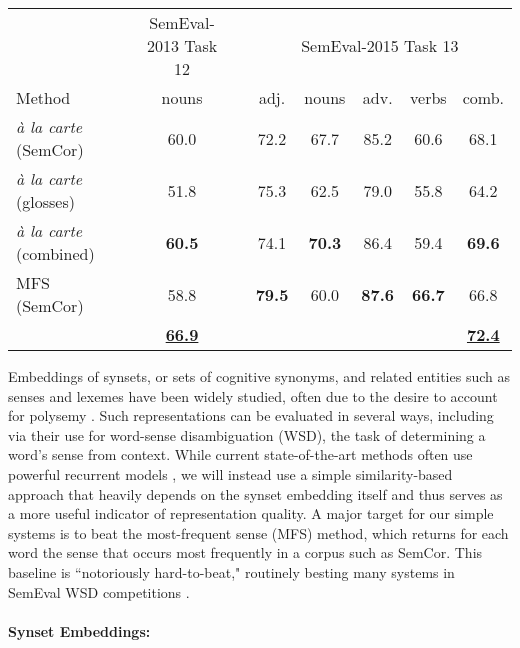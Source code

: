 \documentclass[11pt,a4paper]{article}
\begin{document}
\begin{table*}[t!]
	\centering
	\begin{threeparttable}
		\begin{tabular}{lcccccccc}
			&& SemEval-2013 Task 12 && \multicolumn{5}{c}{SemEval-2015 Task 13}\\
			Method && nouns && adj. & nouns & adv. & verbs & comb. \\
			\toprule
			{\em\`a la carte} (SemCor) && 60.0 && 72.2 & 67.7 & 85.2 & 60.6 & 68.1 \\
			{\em\`a la carte} (glosses) && 51.8 && 75.3 & 62.5 & 79.0 & 55.8 & 64.2 \\
			{\em\`a la carte} (combined) && \bf60.5 && 74.1 & \bf70.3 & 86.4 & 59.4 & \bf69.6\\
			\midrule
			MFS (SemCor) && 58.8 && \bf79.5 & 60.0 & \bf87.6 & \bf 66.7 & 66.8 \\
			\citet{Raganato:17} && \underline{\bf66.9} && & & & & \underline{\bf72.4} \\
			\bottomrule
		\end{tabular}
	\end{threeparttable}
	\caption{\label{tbl:wsd}
		Application of {\em\`a la carte} synset embeddings to two standard WSD tasks.
		As all systems always return exactly one answer, performance is measured in terms of accuracy.
		Results due to \citet{Raganato:17}, who use a bi-LSTM for this task, are given as the recent state-of-the-art result.
	}
\end{table*}


Embeddings of synsets, or sets of cognitive synonyms, and related entities such as senses and lexemes have been widely studied, often due to the desire to account for polysemy \cite{Rothe:15,Iacobacci:15}.
Such representations can be evaluated in several ways, including via their use for word-sense disambiguation (WSD), the task of determining a word's sense from context.
While current state-of-the-art methods often use powerful recurrent models \cite{Raganato:17}, we will instead use a simple similarity-based approach that heavily depends on the synset embedding itself and thus serves as a more useful indicator of representation quality.
A major target for our simple systems is to beat the most-frequent sense (MFS) method, which returns for each word the sense that occurs most frequently in a corpus such as SemCor.
This baseline is ``notoriously hard-to-beat," routinely besting many systems in SemEval WSD competitions \cite{Navigli:13}.

\paragraph{Synset Embeddings:}
\end{document}
